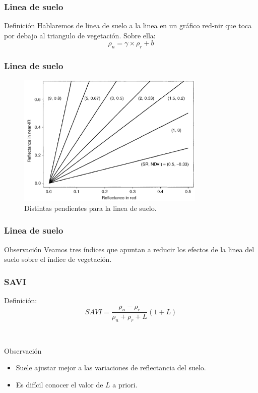 \documentclass[handout]{beamer}
\begin{document}
\begin{frame}
    \frametitle{Linea de suelo}
     \begin{block}{Definición}
        Hablaremos de linea de suelo a la linea en un gráfico red-nir que toca
        por debajo al triangulo de vegetación. Sobre ella:
         \begin{equation}
             \rho_n = \gamma \times \rho_r +b
         \end{equation}
     \end{block}
\end{frame}

\begin{frame}
    \frametitle{Linea de suelo}
    \begin{figure}
    \begin{center}
        \includegraphics[width=0.8\textwidth]{imagenes/soiline.png}
    \end{center}
        \caption{Distintas pendientes para la linea de
        suelo.}
    \end{figure}
\end{frame}

\begin{frame}
    \frametitle{Linea de suelo}
    \begin{block}{Observación}
        Veamos tres índices que apuntan a reducir los efectos de la linea del
        suelo sobre el índice de vegetación.
    \end{block}
\end{frame}

\begin{frame}
    \frametitle{SAVI}
    \begin{block}{Definición:}
        \begin{equation}
            SAVI = \frac{\rho_n-\rho_r}{\rho_n+\rho_r+L}(1+L)
        \end{equation}
    \end{block}\pause\
    \begin{block}{Observación}
        \begin{itemize}[<+->]
            \item Suele ajustar mejor a las variaciones de reflectancia del
                suelo.
            \item Es difícil conocer el valor de $L$ a priori.
        \end{itemize}
    \end{block}
\end{frame}
\end{document}
